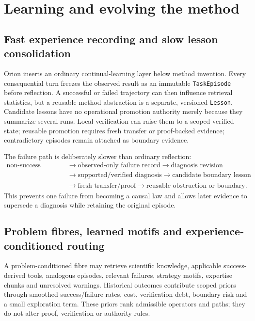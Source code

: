 \section{Learning and evolving the method}


\subsection{Fast experience recording and slow lesson consolidation}
Orion inserts an ordinary continual-learning layer below method invention. Every consequential turn freezes the observed result as an immutable \texttt{TaskEpisode} before reflection. A successful or failed trajectory can then influence retrieval statistics, but a reusable method abstraction is a separate, versioned \texttt{Lesson}. Candidate lessons have no operational promotion authority merely because they summarize several runs. Local verification can raise them to a scoped verified state; reusable promotion requires fresh transfer or proof-backed evidence; contradictory episodes remain attached as boundary evidence.

The failure path is deliberately slower than ordinary reflection:
\begin{equation}
\begin{aligned}
\text{non-success episode}
&\to \text{observed-only failure record}
\to \text{diagnosis revision}\\
&\to \text{supported/verified diagnosis}
\to \text{candidate boundary lesson}\\
&\to \text{fresh transfer/proof}
\to \text{reusable obstruction or boundary}.
\end{aligned}
\end{equation}
This prevents one failure from becoming a causal law and allows later evidence to supersede a diagnosis while retaining the original episode.

\subsection{Problem fibres, learned motifs and experience-conditioned routing}
A problem-conditioned fibre may retrieve scientific knowledge, applicable success-derived tools, analogous episodes, relevant failures, strategy motifs, expertise chunks and unresolved warnings. Historical outcomes contribute scoped priors through smoothed success/failure rates, cost, verification debt, boundary risk and a small exploration term. These priors rank admissible operators and paths; they do not alter proof, verification or authority rules.

